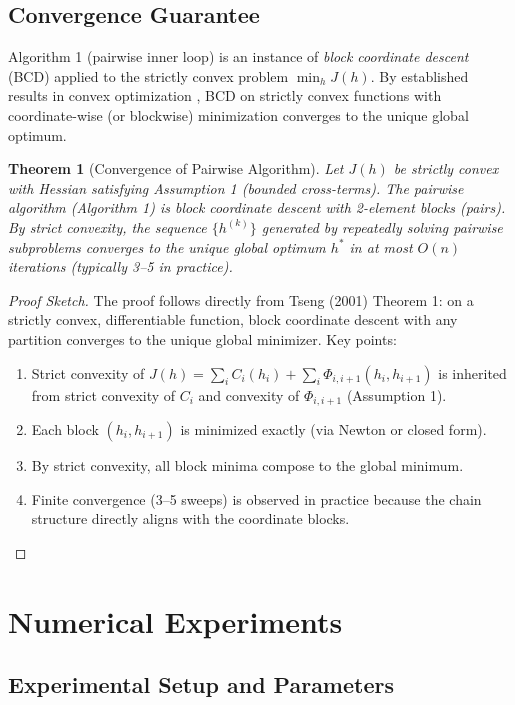 \documentclass[12pt]{article}
\newtheorem{theorem}{Theorem}[section]
\theoremstyle{definition}
\begin{document}
\subsection{Convergence Guarantee}

Algorithm 1 (pairwise inner loop) is an instance of \emph{block coordinate descent} (BCD) applied to the strictly convex problem $\min_h J(h)$. By established results in convex optimization \cite{Tseng:BCD}, BCD on strictly convex functions with coordinate-wise (or blockwise) minimization converges to the unique global optimum.

\begin{theorem}[Convergence of Pairwise Algorithm]
Let $J(h)$ be strictly convex with Hessian satisfying Assumption 1 (bounded cross-terms). The pairwise algorithm (Algorithm 1) is block coordinate descent with 2-element blocks (pairs). By strict convexity, the sequence $\{h^{(k)}\}$ generated by repeatedly solving pairwise subproblems converges to the unique global optimum $h^*$ in at most $O(n)$ iterations (typically 3–5 in practice).
\end{theorem}

\begin{proof}[Proof Sketch]
The proof follows directly from Tseng (2001) Theorem 1: on a strictly convex, differentiable function, block coordinate descent with any partition converges to the unique global minimizer. Key points:
\begin{enumerate}
    \item Strict convexity of $J(h) = \sum_i C_i(h_i) + \sum_i \Phi_{i,i+1}(h_i, h_{i+1})$ is inherited from strict convexity of $C_i$ and convexity of $\Phi_{i,i+1}$ (Assumption 1).
    \item Each block $(h_i, h_{i+1})$ is minimized exactly (via Newton or closed form).
    \item By strict convexity, all block minima compose to the global minimum.
    \item Finite convergence (3–5 sweeps) is observed in practice because the chain structure directly aligns with the coordinate blocks.
\end{enumerate}
\end{proof}

\section{Numerical Experiments}

\subsection*{Experimental Setup and Parameters}
\end{document}
